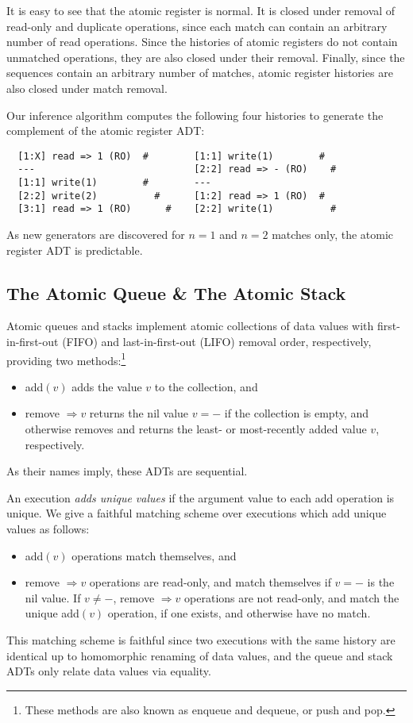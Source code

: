 It is easy to see that the atomic register is normal. It is
closed under removal of read-only and duplicate operations, since  each
match can contain an arbitrary number of read operations. Since the histories
of atomic registers do not contain unmatched operations, they are also closed
under their removal. Finally, since the sequences contain an arbitrary number of
matches, atomic register histories are also closed under match
removal.

Our inference algorithm computes the following four histories to generate the
complement of the atomic register ADT:
\begin{verbatim}
  [1:X] read => 1 (RO)  #        [1:1] write(1)        #
  ---                            [2:2] read => - (RO)    #
  [1:1] write(1)        #        ---
  [2:2] write(2)          #      [1:2] read => 1 (RO)  #
  [3:1] read => 1 (RO)      #    [2:2] write(1)          #
\end{verbatim}
As new generators are discovered for $n=1$ and $n=2$ matches only, the atomic
register ADT is predictable.

\subsection{The Atomic Queue \& The Atomic Stack}

Atomic queues and stacks implement atomic collections of data values with
first-in-first-out (FIFO) and last-in-first-out (LIFO) removal order,
respectively, providing two methods:\footnote{These methods are also known as
enqueue and dequeue, or push and pop.}
\begin{itemize}

  \item add$(v)$ adds the value $v$ to the collection, and

  \item remove $\Rightarrow v$ returns the nil value $v = -$ if the
  collection is empty, and otherwise removes and returns the least- or
  most-recently added value $v$, respectively.

\end{itemize}
As their names imply, these ADTs are sequential.

An execution \emph{adds unique values} if the argument value to each add
operation is unique. We give a faithful matching scheme over executions which
add unique values as follows:
\begin{itemize}

  \item add$(v)$ operations match themselves, and

  \item remove $\Rightarrow v$ operations are read-only, and match themselves
  if $v = -$ is the nil value. If $v \neq -$, remove
  $\Rightarrow v$ operations are not read-only, and match the unique add$(v)$
  operation, if one exists, and otherwise have no match.

\end{itemize}
This matching scheme is faithful since two executions with the same history are
identical up to homomorphic renaming of data values, and the queue and stack
ADTs only relate data values via equality.

